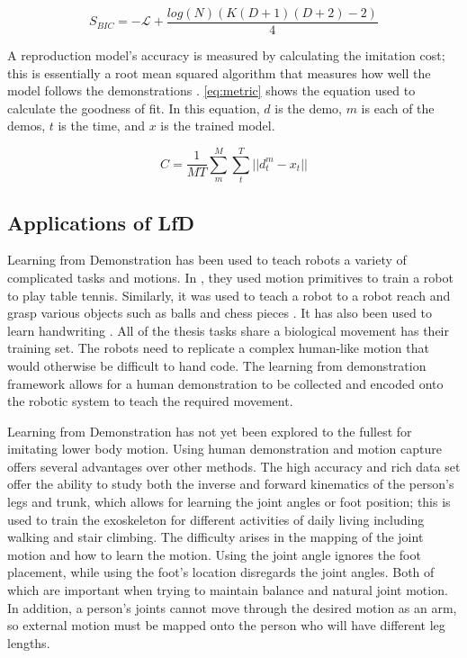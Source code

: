 \begin{equation} 
    S_{BIC} = -\mathcal{L} + \frac{log(N)(K(D+1)(D+2)-2)}{4}  
    \label{eq:BIC} 
\end{equation} 


A reproduction model's accuracy is measured by calculating the imitation cost; this is essentially a root mean squared algorithm that measures how well the model follows the demonstrations \cite{metric}. \autoref{eq:metric} shows the equation used to calculate the goodness of fit. In this equation, $d$ is the demo, $m$ is each of the demos, $t$ is the time, and $x$ is the trained model. 

\begin{equation}
    C = \frac{1}{MT} \sum_m^M{\sum_t^T{ || d^m_t - x_t||}}
    \label{eq:metric}
\end{equation}


 

\subsection{Applications of LfD}
\label{sec:applfd}
Learning from Demonstration has been used to teach robots a variety of complicated tasks and motions. In \cite{mulling2013learning}, they used motion primitives to train a robot to play table tennis. Similarly, it was used to teach a robot to a robot reach and grasp various objects such as balls and chess pieces \cite{calinon2007active}  \cite{hersch2008dynamical}. It has also been used to learn handwriting \cite{kulvicius2011joining}. All of the thesis tasks share a biological movement has their training set. The robots need to replicate a complex human-like motion that would otherwise be difficult to hand code. The learning from demonstration framework allows for a human demonstration to be collected and encoded onto the robotic system to teach the required movement.  

Learning from Demonstration has not yet been explored to the fullest for imitating lower body motion. Using human demonstration and motion capture offers several advantages over other methods. The high accuracy and rich data set offer the ability to study both the inverse and forward kinematics of the person's legs and trunk, which allows for learning the joint angles or foot position; this is used to train the exoskeleton for different activities of daily living including walking and stair climbing. The difficulty arises in the mapping of the joint motion and how to learn the motion. Using the joint angle ignores the foot placement, while using the foot's location disregards the joint angles. Both of which are important when trying to maintain balance and natural joint motion. In addition, a person's joints cannot move through the desired motion as an arm, so external motion must be mapped onto the person who will have different leg lengths. 



